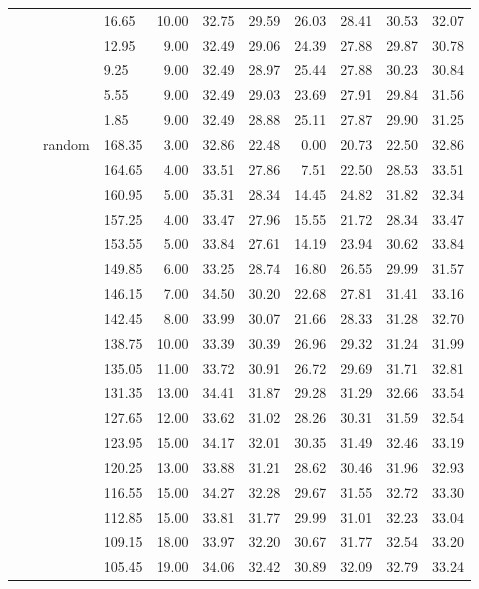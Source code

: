 \begin{longtable}{llllrrrrrrr}
   &  &  & 16.65 & 10.00 & 32.75 & 29.59 & 26.03 & 28.41 & 30.53 & 32.07 \\ 
   &  &  & 12.95 & 9.00 & 32.49 & 29.06 & 24.39 & 27.88 & 29.87 & 30.78 \\ 
   &  &  & 9.25 & 9.00 & 32.49 & 28.97 & 25.44 & 27.88 & 30.23 & 30.84 \\ 
   &  &  & 5.55 & 9.00 & 32.49 & 29.03 & 23.69 & 27.91 & 29.84 & 31.56 \\ 
   &  &  & 1.85 & 9.00 & 32.49 & 28.88 & 25.11 & 27.87 & 29.90 & 31.25 \\ 
   &  & random & 168.35 & 3.00 & 32.86 & 22.48 & 0.00 & 20.73 & 22.50 & 32.86 \\ 
   &  &  & 164.65 & 4.00 & 33.51 & 27.86 & 7.51 & 22.50 & 28.53 & 33.51 \\ 
   &  &  & 160.95 & 5.00 & 35.31 & 28.34 & 14.45 & 24.82 & 31.82 & 32.34 \\ 
   &  &  & 157.25 & 4.00 & 33.47 & 27.96 & 15.55 & 21.72 & 28.34 & 33.47 \\ 
   &  &  & 153.55 & 5.00 & 33.84 & 27.61 & 14.19 & 23.94 & 30.62 & 33.84 \\ 
   &  &  & 149.85 & 6.00 & 33.25 & 28.74 & 16.80 & 26.55 & 29.99 & 31.57 \\ 
   &  &  & 146.15 & 7.00 & 34.50 & 30.20 & 22.68 & 27.81 & 31.41 & 33.16 \\ 
   &  &  & 142.45 & 8.00 & 33.99 & 30.07 & 21.66 & 28.33 & 31.28 & 32.70 \\ 
   &  &  & 138.75 & 10.00 & 33.39 & 30.39 & 26.96 & 29.32 & 31.24 & 31.99 \\ 
   &  &  & 135.05 & 11.00 & 33.72 & 30.91 & 26.72 & 29.69 & 31.71 & 32.81 \\ 
   &  &  & 131.35 & 13.00 & 34.41 & 31.87 & 29.28 & 31.29 & 32.66 & 33.54 \\ 
   &  &  & 127.65 & 12.00 & 33.62 & 31.02 & 28.26 & 30.31 & 31.59 & 32.54 \\ 
   &  &  & 123.95 & 15.00 & 34.17 & 32.01 & 30.35 & 31.49 & 32.46 & 33.19 \\ 
   &  &  & 120.25 & 13.00 & 33.88 & 31.21 & 28.62 & 30.46 & 31.96 & 32.93 \\ 
   &  &  & 116.55 & 15.00 & 34.27 & 32.28 & 29.67 & 31.55 & 32.72 & 33.30 \\ 
   &  &  & 112.85 & 15.00 & 33.81 & 31.77 & 29.99 & 31.01 & 32.23 & 33.04 \\ 
   &  &  & 109.15 & 18.00 & 33.97 & 32.20 & 30.67 & 31.77 & 32.54 & 33.20 \\ 
   &  &  & 105.45 & 19.00 & 34.06 & 32.42 & 30.89 & 32.09 & 32.79 & 33.24 \\ 

\end{longtable}
